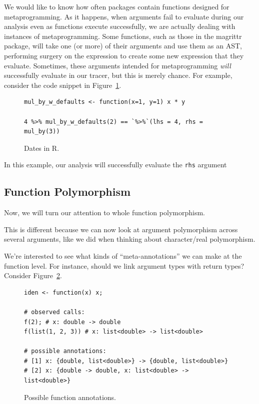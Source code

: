\documentclass[acmsmall,10pt,review,anonymous]{acmart}\settopmatter{printfolios=true,printccs=false,printacmref=false}
\begin{document}
We would like to know how often packages contain functions designed for metaprogramming.
As it happens, when arguments fail to evaluate during our analysis even as functions execute successfully, we are actually dealing with instances of metaprogramming.
Some functions, such as those in the magrittr package, will take one (or more) of their arguments and use them as an AST, performing surgery on the expression to create some new expression that they evaluate.
Sometimes, these arguments intended for metaprogramming {\it will} successfully evaluate in our tracer, but this is merely chance.
For example, consider the code snippet in Figure~\ref{fig:metaexworks}.

\begin{figure}[!hb]{\small\begin{lstlisting}[style=R]
mul_by_w_defaults <- function(x=1, y=1) x * y

4 %>% mul_by_w_defaults(2) == `%>%`(lhs = 4, rhs = mul_by(3))
\end{lstlisting}}\caption{Dates in R.}\label{fig:metaexworks}\end{figure}

In this example, our analysis will successfully evaluate the {\tt rhs} argument

%
%
%
%
\subsection{Function Polymorphism}

Now, we will turn our attention to whole function polymorphism.

This is different because we can now look at argument polymorphism across several arguments, like we did when thinking about character/real polymorphism.

We're interested to see what kinds of ``meta-annotations'' we can make at the function level.
For instance, should we link argument types with return types?
Consider Figure~\ref{fig:funanno}.
\begin{figure}[!hb]{\small\begin{lstlisting}[style=R]
iden <- function(x) x;

# observed calls:
f(2); # x: double -> double
f(list(1, 2, 3)) # x: list<double> -> list<double>

# possible annotations:
# [1] x: {double, list<double>} -> {double, list<double>}
# [2] x: {double -> double, x: list<double> -> list<double>}
\end{lstlisting}}\caption{Possible function annotations.}\label{fig:funanno}\end{figure}
\end{document}
